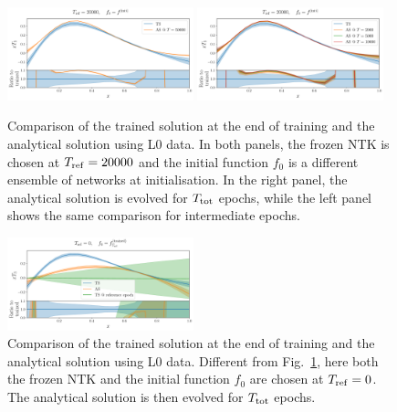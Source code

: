 \newpage


\begin{figure}[h]
    \centering
    \includegraphics[width=0.48\textwidth]{plots/pdf_plot_init_last_epoch_L0.pdf}
    \includegraphics[width=0.48\textwidth]{plots/pdf_plot_init_epochs_L0.pdf}
    \caption{Comparison of the trained solution at the end of training and
    the analytical solution using L0 data. In both panels, the
    frozen NTK is chosen at $T_{\rm ref} = 20000$ and the initial function $f_0$
    is a different ensemble of networks at initialisation. In the right panel,
    the analytical solution is evolved for $T_{\rm tot}$ epochs, while the left
    panel shows the same comparison for intermediate epochs.}
    \label{fig:xT3_analytical_init_L0}
  \end{figure}
  \begin{figure}[h]
    \centering
    \includegraphics[width=0.48\textwidth]{plots/pdf_plot_ref_0_L0.pdf}
    \caption{Comparison of the trained solution at the end of training and
    the analytical solution using L0 data. Different from
    Fig.~\ref{fig:xT3_analytical_init_L0}, here both the frozen NTK and the
    initial function $f_0$ are chosen at $T_{\rm ref} = 0$. The analytical
    solution is then  evolved for $T_{\rm tot}$ epochs.}
    \label{fig:xT3_analytical_tref0_L0}
  \end{figure}
